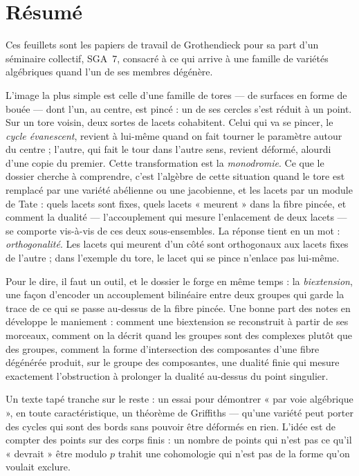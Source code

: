 \documentclass[11pt,a4paper]{article}
\begin{document}
\section*{Résumé}

\begin{resume}
Ces feuillets sont les papiers de travail de Grothendieck pour sa part d'un
séminaire collectif, SGA~7, consacré à ce qui arrive à une famille de variétés
algébriques quand l'un de ses membres dégénère.

L'image la plus simple est celle d'une famille de tores --- de surfaces en forme
de bouée --- dont l'un, au centre, est pincé : un de ses cercles s'est réduit à
un point. Sur un tore voisin, deux sortes de lacets cohabitent. Celui qui va se
pincer, le \emph{cycle évanescent}, revient à lui-même quand on fait tourner le
paramètre autour du centre ; l'autre, qui fait le tour dans l'autre sens, revient
déformé, alourdi d'une copie du premier. Cette transformation est la
\emph{monodromie}. Ce que le dossier cherche à comprendre, c'est l'algèbre de
cette situation quand le tore est remplacé par une variété abélienne ou une
jacobienne, et les lacets par un module de Tate : quels lacets sont fixes, quels
lacets « meurent » dans la fibre pincée, et comment la dualité --- l'accouplement
qui mesure l'enlacement de deux lacets --- se comporte vis-à-vis de ces deux
sous-ensembles. La réponse tient en un mot : \emph{orthogonalité}. Les lacets qui
meurent d'un côté sont orthogonaux aux lacets fixes de l'autre ; dans l'exemple
du tore, le lacet qui se pince n'enlace pas lui-même.

Pour le dire, il faut un outil, et le dossier le forge en même temps : la
\emph{biextension}, une façon d'encoder un accouplement bilinéaire entre deux
groupes qui garde la trace de ce qui se passe au-dessus de la fibre pincée. Une
bonne part des notes en développe le maniement : comment une biextension se
reconstruit à partir de ses morceaux, comment on la décrit quand les groupes sont
des complexes plutôt que des groupes, comment la forme d'intersection des
composantes d'une fibre dégénérée produit, sur le groupe des composantes, une
dualité finie qui mesure exactement l'obstruction à prolonger la dualité
au-dessus du point singulier.

Un texte tapé tranche sur le reste : un essai pour démontrer « par voie
algébrique », en toute caractéristique, un théorème de Griffiths --- qu'une
variété peut porter des cycles qui sont des bords sans pouvoir être déformés en
rien. L'idée est de compter des points sur des corps finis : un nombre de points
qui n'est pas ce qu'il « devrait » être modulo $p$ trahit une cohomologie qui
n'est pas de la forme qu'on voulait exclure.


\end{resume}
\end{document}
